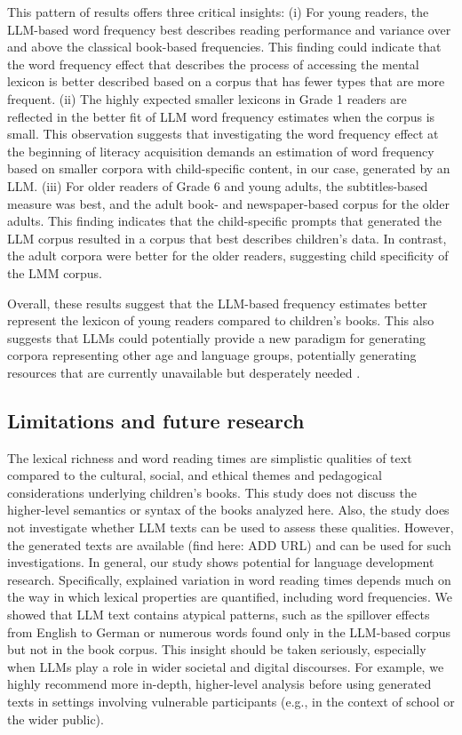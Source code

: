 \documentclass[jou, a4paper]{apa7}
\begin{document}
This pattern of results offers three critical insights: (i) For young readers, the LLM-based word frequency best describes reading performance and variance over and above the classical book-based frequencies. This finding could indicate that the word frequency effect that describes the process of accessing the mental lexicon \citep{brysbaert_word_2018, brysbaert_word_2011, gregorova_access_2023} is better described based on a corpus that has fewer types that are more frequent. (ii) The highly expected smaller lexicons in Grade 1 readers \citep[e.g.][]{segbers_how_2017} are reflected in the better fit of LLM word frequency estimates when the corpus is small. This observation suggests that investigating the word frequency effect at the beginning of literacy acquisition demands an estimation of word frequency based on smaller corpora with child-specific content, in our case, generated by an LLM. (iii) For older readers of Grade 6 and young adults, the subtitles-based measure was best, and the adult book- and newspaper-based corpus for the older adults. This finding indicates that the child-specific prompts that generated the LLM corpus resulted in a corpus that best describes children's data. In contrast, the adult corpora were better for the older readers, suggesting child specificity of the LMM corpus.  

Overall, these results suggest that the LLM-based frequency estimates better represent the lexicon of young readers compared to children's books. This also suggests that LLMs could potentially provide a new paradigm for generating corpora representing other age and language groups, potentially generating resources that are currently unavailable but desperately needed \citep[e.g., frequency measures in underrepresented languages][]{gagl_eye_2022, blasi_over-reliance_2022}. 

\subsection*{Limitations and future research}

The lexical richness and word reading times are simplistic qualities of text compared to the cultural, social, and ethical themes and pedagogical considerations underlying children's books. This study does not discuss the higher-level semantics or syntax of the books analyzed here. Also, the study does not investigate whether LLM texts can be used to assess these qualities. However, the generated texts are available (find here: ADD URL) and can be used for such investigations. In general, our study shows potential for language development research. Specifically, explained variation in word reading times depends much on the way in which lexical properties are quantified, including word frequencies. We showed that LLM text contains atypical patterns, such as the spillover effects from English to German or numerous words found only in the LLM-based corpus but not in the book corpus. This insight should be taken seriously, especially when LLMs play a role in wider societal and digital discourses. For example, we highly recommend more in-depth, higher-level analysis before using generated texts in settings involving vulnerable participants (e.g., in the context of school or the wider public). 
\end{document}

